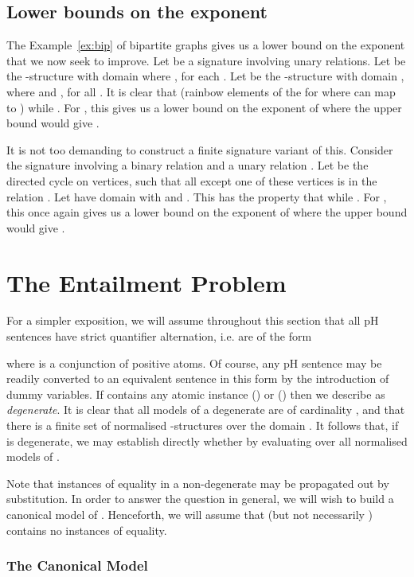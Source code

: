 \documentclass{LMCS}
\begin{document}
\subsection{Lower bounds on the exponent}
\label{sec:lowerbound}

The Example~\ref{ex:bip} of bipartite graphs gives us a lower bound on the exponent that we now seek to improve.
Let  be a signature involving  unary relations. Let  be the -structure with domain  where , for each . Let  be the -structure  with domain , where  and , for all . It is clear that  (rainbow elements of the for  where  can map to ) while . For , this gives us a lower bound on the exponent of  where the upper bound would give .

It is not too demanding to construct a finite signature variant of this. Consider the signature  involving a binary relation  and a unary relation . Let  be the directed cycle on  vertices, such that all except one of these vertices is in the relation . Let  have domain  with  and . This has the property that  while . For , this once again gives us a lower bound on the exponent of  where the upper bound would give .

\section{The Entailment Problem}
\label{sec:LHS}

For a simpler exposition, we will assume throughout this section that all pH sentences have strict quantifier alternation, i.e. are of the form

where  is a conjunction of positive atoms. Of course, any pH sentence may be readily converted to an equivalent sentence in this form by the introduction of dummy variables. If  contains any atomic instance  () or  () then we describe  as \emph{degenerate}. It is clear that all models of a degenerate  are of cardinality , and that there is a finite set of normalised -structures over the domain . It follows that, if  is degenerate, we may establish directly whether  by evaluating  over all normalised models of . 

Note that instances of equality in a non-degenerate  may be propagated out by substitution. In order to answer the question  in general, we will wish to build a canonical model of . Henceforth, we will assume that  (but not necessarily ) contains no instances of equality.

\subsubsection*{The Canonical Model}
\end{document}
